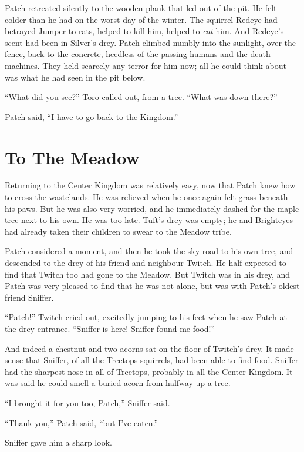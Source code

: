\documentclass[ebook,oneside,openany,17pt]{memoir}
\newenvironment{tolerant}[1]{%
  \par\tolerance=#1\relax
}{%
  \par
}
\renewcommand{\thechapter}{\Roman{chapter}}
\newcounter{sections}
\newcommand{\sections}[1]{%
  \section*{#1}
  \addtocounter{sections}{1}%
  \pdfbookmark[1]{#1}{section.\thechapter.\thesections}}
\begin{document}
\begin{tolerant}{500}
Patch retreated silently to the wooden plank that led out of the
pit. He felt colder than he had on the worst day of the winter. The
squirrel Redeye had betrayed Jumper to rats, helped to kill him,
helped to \emph{eat} him. And Redeye’s scent had been in Silver’s
drey. Patch climbed numbly into the sunlight, over the fence, back to
the concrete, heedless of the passing humans and the death
machines. They held scarcely any terror for him now; all he could
think about was what he had seen in the pit below.
\end{tolerant}

“What did you see?” Toro called out, from a tree. “What was down
there?”

Patch said, “I have to go back to the Kingdom.”


\sections{To The Meadow}

\begin{tolerant}{1000}
Returning to the Center Kingdom was relatively easy, now that Patch
knew how to cross the wastelands. He was relieved when he once again
felt grass beneath his paws. But he was also very worried, and he
immediately dashed for the maple tree next to his own. He was too
late. Tuft’s drey was empty; he and Brighteyes had already taken their
children to swear to the Meadow tribe.
\end{tolerant}

Patch considered a moment, and then he took the sky-road to his own
tree, and descended to the drey of his friend and neighbour Twitch. He
half-expected to find that Twitch too had gone to the Meadow. But
Twitch was in his drey, and Patch was very pleased to find that he was
not alone, but was with Patch’s oldest friend Sniffer.

“Patch!” Twitch cried out, excitedly jumping to his feet when he saw
Patch at the drey entrance. “Sniffer is here! Sniffer found me food!”

And indeed a chestnut and two acorns sat on the floor of Twitch’s
drey. It made sense that Sniffer, of all the Treetops squirrels, had
been able to find food. Sniffer had the sharpest nose in all of
Treetops, probably in all the Center Kingdom. It was said he could
smell a buried acorn from halfway up a tree.

“I brought it for you too, Patch,” Sniffer said.

“Thank you,” Patch said, “but I’ve eaten.”

Sniffer gave him a sharp look.
\end{document}
